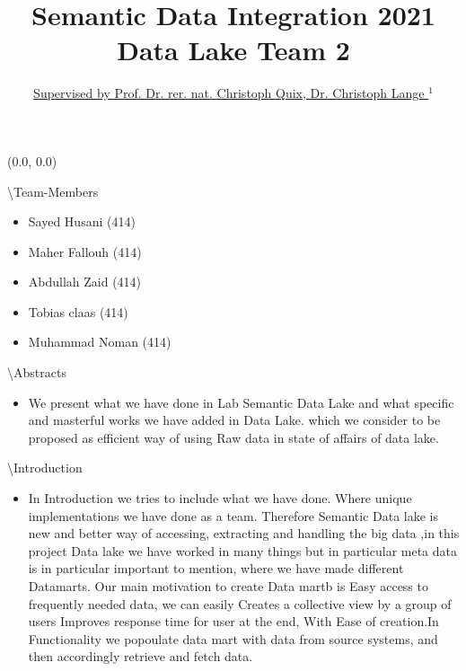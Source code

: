 \documentclass[12pt]{beamer}
\title{Semantic Data Integration 2021 \\ Data Lake Team 2}
\author{\hspace{1em}\underline{\vphantom{Wy}Supervised by Prof. Dr. rer. nat. Christoph Quix, Dr. Christoph Lange }$^1$} %
\begin{document}
\begin{textblock}{0.5}(0.0, 0.0)


\begin{block}{\textbackslash Team-Members}
\begin{itemize}
\item Sayed Husani (414)
\item Maher Fallouh (414)
\item Abdullah Zaid (414)
\item Tobias claas (414)
\item Muhammad Noman (414)

\end{itemize}
\end{block}


\begin{block}{\textbackslash Abstracts}
\begin{itemize}
\item We present what we have done in Lab Semantic Data Lake and what specific and masterful works we have added in Data Lake. which we consider to be proposed as efficient way of using Raw data in state of affairs of data lake.
\end{itemize}
\end{block}

\begin{block}{\textbackslash Introduction}
\begin{itemize}
\item In Introduction we tries to include what we have done. Where unique implementations we have done as a team. Therefore Semantic Data lake is new and better way of accessing, extracting and handling the big data  ,in this project Data lake we have worked in many things but in particular meta data is in particular important to mention, where we have made different Datamarts. Our main motivation to create Data martb is Easy access to frequently needed data,
we can easily Creates a collective view by a group of users
Improves response time for user at the end, With
Ease of creation.In Functionality we popoulate data mart with data from source systems, and then accordingly retrieve and fetch data.

\begin{figure}



\end{figure}
\end{itemize}
\end{block}
\end{textblock}
\end{document}
